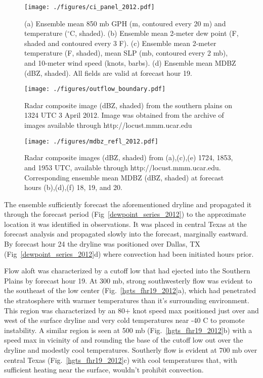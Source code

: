 \documentclass{ttuthes2007}
\newcommand{\tab}{\hspace*{2em}}  %
\begin{document}
\begin{figure}[!tb]
  \centering
  \noindent\texttt{[image: ./figures/ci\_panel\_2012.pdf]}\\
  \caption{(a) Ensemble mean 850 mb GPH (m, contoured every 20 m) and temperature (${}^{\circ}$C, shaded). (b) Ensemble mean 2-meter dew point (F, shaded and contoured every 3 F). (c) Ensemble mean 2-meter temperature (F, shaded), mean SLP (mb, contoured every 2 mb), and 10-meter wind speed (knots, barbs). (d) Ensemble mean MDBZ (dBZ, shaded). All fields are valid at forecast hour 19.}
\label{ci_panel_2012}
\end{figure}

\begin{figure}[!tb]
  \centering
  \noindent\texttt{[image: ./figures/outflow\_boundary.pdf]}\\
  \caption{Radar composite image (dBZ, shaded) from the southern plains on 1324 UTC 3 April 2012. Image was obtained from the archive of images available through http://locust.mmm.ucar.edu}
\label{outflow_boundary}
\end{figure}

\begin{figure}[!tb]
  \centering
  \noindent\texttt{[image: ./figures/mdbz\_refl\_2012.pdf]}\\
  \caption{Radar composite images (dBZ, shaded) from (a),(c),(e) 1724, 1853, and 1953 UTC, available through http://locust.mmm.ucar.edu. Corresponding ensemble mean MDBZ (dBZ, shaded) at forecast hours (b),(d),(f) 18, 19, and 20.}
\label{mdbz_refl_2012}
\end{figure}

\tab The ensemble sufficiently forecast the aforementioned dryline and propagated it through the forecast period (Fig~\ref{dewpoint_series_2012}) to the approximate location it was identified in observations. It was placed in central Texas at the forecast analysis and propagated slowly into the forecast, marginally eastward. By forecast hour 24 the dryline was positioned over Dallas, TX (Fig~\ref{dewpoint_series_2012}d) where convection had been initiated hours prior. 

\tab Flow aloft was characterized by a cutoff low that had ejected into the Southern Plains by forecast hour 19. At 300 mb, strong southwesterly flow was evident to the southeast of the low center (Fig.~\ref{hgts_fhr19_2012}a), which had penetrated the stratosphere with warmer temperatures than it's surrounding environment. This region was characterized by an 80+ knot speed max positioned just over and west of the surface dryline and very cold temperatures near -40 C to promote instability. A similar region is seen at 500 mb (Fig.~\ref{hgts_fhr19_2012}b) with a speed max in vicinity of and rounding the base of the cutoff low out over the dryline and modestly cool temperatures. Southerly flow is evident at 700 mb over central Texas (Fig.~\ref{hgts_fhr19_2012}c) with cool temperatures that, with sufficient heating near the surface, wouldn't prohibit convection. 
\end{document}
